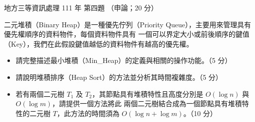 \begin{pastexam}[label={px:df3-111-ds-04}]{地方三等資訊處理 111 年 第四題}
（申論；20 分）

二元堆積（Binary Heap）是一種優先佇列（Priority Queue），主要用來管理具有優先權順序的資料物件，每個資料物件具有
一個可以界定大小或前後順序的鍵值（Key），我們在此假設鍵值越低的資料物件有越高的優先權。
\begin{itemize}[leftmargin=2.2em, nosep]
\item[㈠] 請完整描述最小堆積（Min\_Heap）的定義與相關的操作功能。（5 分）
\item[㈡] 請說明堆積排序（Heap Sort）的方法並分析其時間複雜度。（5 分）
\item[㈢] 若有兩個二元樹 $T_1$ 及 $T_2$，其節點具有堆積特性且高度分別是 $O(\log n)$ 與 $O(\log m)$，請提供一個方法將此
兩個二元樹結合成為一個節點具有堆積特性的二元樹 $T$，此方法的時間須為 $O(\log n + \log m)$。（10 分）
\end{itemize}
\end{pastexam}

